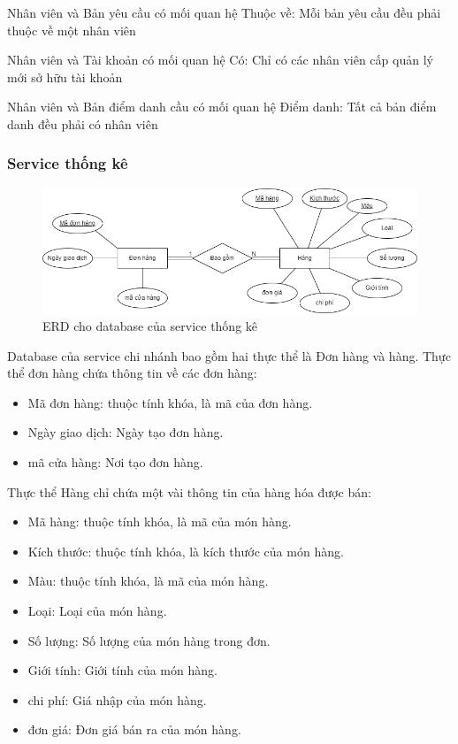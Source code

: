 Nhân viên và Bản yêu cầu có mối quan hệ Thuộc về: Mỗi bản yêu cầu đều phải thuộc về một nhân viên

Nhân viên và Tài khoản có mối quan hệ Có: Chỉ có các nhân viên cấp quản lý mới sở hữu tài khoản

Nhân viên và Bản điểm danh cầu có mối quan hệ Điểm danh: Tất cả bản điểm danh đều phải có nhân viên


\subsubsection{Service thống kê}
\begin{figure}[!htp]
	\begin{center}
		\includegraphics[width=12cm]{img/database/erd/Statistic.png}
		\newline
		\caption{ERD cho database của service thống kê}
	\end{center}
\end{figure}

Database của service chi nhánh bao gồm hai thực thể là Đơn hàng và hàng. Thực thể đơn hàng chứa thông tin về các đơn hàng:
\begin{itemize}
	\item Mã đơn hàng: thuộc tính khóa, là mã của đơn hàng.
	\item Ngày giao dịch: Ngày tạo đơn hàng.
	\item mã cửa hàng: Nơi tạo đơn hàng.
\end{itemize}

Thực thể Hàng chỉ chứa một vài thông tin của hàng hóa được bán:
\begin{itemize}
	\item Mã hàng: thuộc tính khóa, là mã của món hàng.
	\item Kích thước: thuộc tính khóa, là kích thước của món hàng.
	\item Màu: thuộc tính khóa, là mã của món hàng.
	\item Loại: Loại của món hàng.
	\item Số lượng: Số lượng của món hàng trong đơn.
	\item Giới tính: Giới tính của món hàng.
	\item chi phí: Giá nhập của món hàng.
	\item đơn giá: Đơn giá bán ra của món hàng.
\end{itemize}

